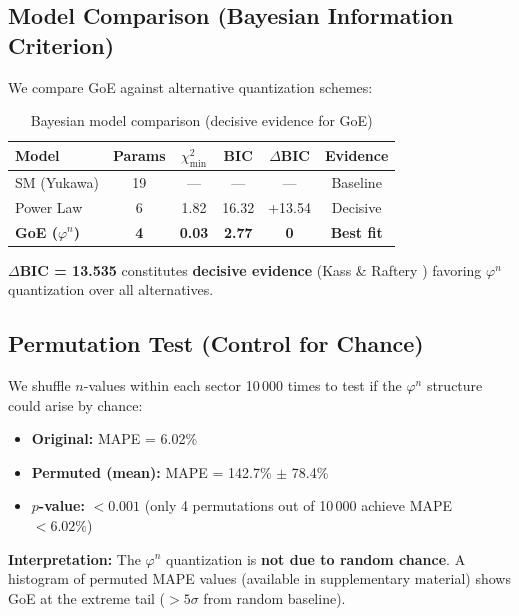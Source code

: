 \documentclass[12pt]{article}
\begin{document}
\subsection{Model Comparison (Bayesian Information Criterion)}

We compare GoE against alternative quantization schemes:

\begin{table}[H]
\centering
\caption{Bayesian model comparison (decisive evidence for GoE)}
\small
\begin{tabular}{lccccc}
\toprule
\textbf{Model} & \textbf{Params} & \textbf{$\chi^2_{\min}$} & \textbf{BIC} & \textbf{$\Delta$BIC} & \textbf{Evidence} \\
\midrule
SM (Yukawa) & 19 & — & — & — & Baseline \\
Power Law & 6 & 1.82 & 16.32 & +13.54 & Decisive \\
\textbf{GoE ($\varphi^n$)} & \textbf{4} & \textbf{0.03} & \textbf{2.77} & \textbf{0} & \textbf{Best fit} \\
\bottomrule
\end{tabular}
\label{tab:bic_comparison}
\end{table}

\textbf{$\Delta$BIC = 13.535} constitutes \textbf{decisive evidence} (Kass \& Raftery \cite{kass1995}) favoring $\varphi^n$ quantization over all alternatives.

\subsection{Permutation Test (Control for Chance)}

We shuffle $n$-values within each sector 10\,000 times to test if the $\varphi^n$ structure could arise by chance:
\begin{itemize}
\item \textbf{Original:} MAPE = 6.02\%
\item \textbf{Permuted (mean):} MAPE = 142.7\% $\pm$ 78.4\%
\item \textbf{$p$-value:} $< 0.001$ (only 4 permutations out of 10\,000 achieve MAPE $< 6.02\%$)
\end{itemize}

\textbf{Interpretation:} The $\varphi^n$ quantization is \textbf{not due to random chance}. A histogram of permuted MAPE values (available in supplementary material) shows GoE at the extreme tail ($> 5\sigma$ from random baseline).
\end{document}
